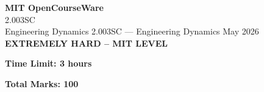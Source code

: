 \documentclass[12pt,a4paper]{exam}
\begin{document}
\begin{center}
{\LARGE \textbf{MIT OpenCourseWare}}\\2.003SC\\Engineering Dynamics
\vspace{0.5cm}
{2.003SC} --- {Engineering Dynamics}
\vspace{0.3cm}
May 2026
\vspace{0.3cm}
\textbf{EXTREMELY HARD -- MIT LEVEL}
\end{center}

\begin{center}
\textbf{Time Limit: 3 hours}
\end{center}

\begin{center}
\textbf{Total Marks: 100}
\end{center}

\vspace{0.5cm}
\end{document}

